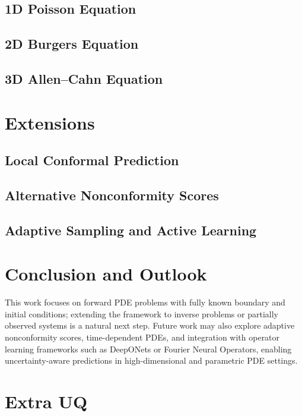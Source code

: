 \documentclass[preprint,12pt]{elsarticle}
\begin{document}
\subsection{1D Poisson Equation}
\label{sec:1d}
\subsection{2D Burgers Equation}
\label{sec:2d}
\subsection{3D Allen–Cahn Equation}
\label{sec:3d}

\section{Extensions}
\label{sec:extension}

\subsection{Local Conformal Prediction}
\label{sec:extension:localcp}

\subsection{Alternative Nonconformity Scores}
\label{sec:extension:nonconf}

\subsection{Adaptive Sampling and Active Learning}
\label{sec:extension:active}

\section{Conclusion and Outlook}
\label{sec:conclusion}

% 
This work focuses on forward PDE problems with fully known boundary and initial conditions; extending the framework to inverse problems or partially observed systems is a natural next step. Future work may also explore adaptive nonconformity scores, time-dependent PDEs, and integration with operator learning frameworks such as DeepONets or Fourier Neural Operators, enabling uncertainty-aware predictions in high-dimensional and parametric PDE settings.

\appendix

\section{Extra UQ}
\label{sec:apd:uq}
\end{document}
